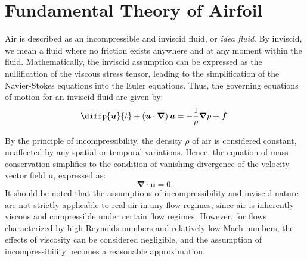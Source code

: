 \documentclass[a4paper, 12pt]{book}
\begin{document}
\chapter{Fundamental Theory of Airfoil}
\label{chap:fundamental_theory_of_airfoil}
\begin{article}
    Air is described as an incompressible and inviscid fluid, or \emph{idea fluid}. By inviscid, we mean a fluid where no friction exists anywhere and at any moment within the fluid. Mathematically, the inviscid assumption can be expressed as the nullification of the viscous stress tensor, leading to the simplification of the Navier-Stokes equations into the Euler equations. Thus, the governing equations of motion for an inviscid fluid are given by:
    \begin{equation}
        \diffp{\bm{u}}{t} + \left( \bm{u} \cdot \bm{\nabla} \right) \bm{u} = - \dfrac{1}{\rho} \bm{\nabla}p + \bm{f}.
    \end{equation}

    By the principle of incompressibility, the density $\rho$ of air is considered constant, unaffected by any spatial or temporal variations. Hence, the equation of mass conservation simplifies to the condition of vanishing divergence of the velocity vector field $\bm{u}$, expressed as:
    \begin{equation}
        \bm{\nabla} \cdot \bm{u} = 0.
    \end{equation}
    It should be noted that the assumptions of incompressibility and inviscid nature are not strictly applicable to real air in any flow regimes, since air is inherently viscous and compressible under certain flow regimes. However, for flows characterized by high Reynolds numbers and relatively low Mach numbers, the effects of viscosity can be considered negligible, and the assumption of incompressibility becomes a reasonable approximation.
\end{article}
\end{document}
